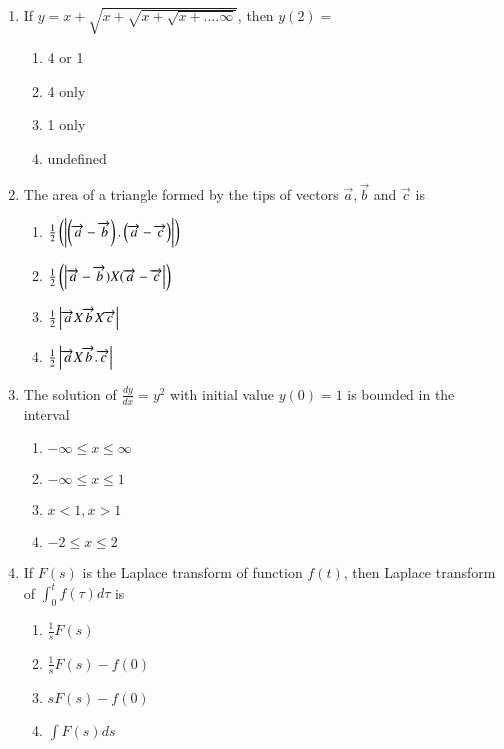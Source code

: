 \documentclass[journal]{IEEEtran}
\begin{document}
\begin{enumerate}
    \item If $y=x+\sqrt{x+\sqrt{x+\sqrt{x+.... \infty}}}$, then $y(2)=$
		\begin{multicols}{4}
			\begin{enumerate}
	\item 4 or 1 
    \item 4 only
    \item 1 only
    \item undefined
	\end{enumerate}
		\end{multicols}

 
    \item The area of a triangle formed by the tips of vectors $\overrightarrow{a}, \overrightarrow{b}$ and $\overrightarrow{c}$ is
		\begin{multicols}{1}
			\begin{enumerate}
				
	\item	$\frac{1}{2}\left(\left\vert\left(\overrightarrow{a}-\overrightarrow{b}\right).\left(\overrightarrow{a}-\overrightarrow{c}\right)\right\vert\right)$	
    \item $\frac{1}{2}\left(\left\vert\overrightarrow{a}-\overrightarrow{b})X(\overrightarrow{a}-\overrightarrow{c}\right\vert\right)$	
     \item $\frac{1}{2}\left\vert\overrightarrow{a}X\overrightarrow{b}X\overrightarrow{c}\right\vert$
      \item $\frac{1}{2}\left\vert\overrightarrow{a}X\overrightarrow{b}.\overrightarrow{c}\right\vert$
			\end{enumerate}
		\end{multicols}


    \item The solution of $\frac{d y}{d x}=y^{2}$ with initial value $y(0)=1$ is bounded in the interval
    \begin{multicols}{4}
            \begin{enumerate}
        \item $-\infty \leq x \leq \infty$
        \item $-\infty \leq x \leq 1$    
        \item $x<1, x>1$
        \item $-2 \leq x \leq 2$
        \end{enumerate}
        \end{multicols}

    \item If $F(s)$ is the Laplace transform of function $f(t)$, then Laplace transform of $\int_{0}^{t} f(\tau) d \tau$ is
    \begin{multicols}{4}
            \begin{enumerate}
              \item  $\frac{1}{s} F(s)$
              \item $\frac{1}{s} F(s)-f(0)$
              \item $s F(s)-f(0)$
              \item  $\int F(s) d s$
              \end{enumerate}
        \end{multicols}



\end{enumerate}
\end{document}
